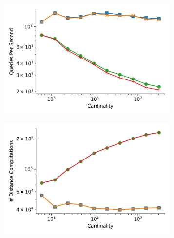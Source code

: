 \begin{figure}
\begin{subfigure}[b]{0.5\textwidth}
        \label{fig:results:glove-25-counts-counts}
    \end{subfigure}%
    \\
    \begin{subfigure}[b]{0.5\textwidth}
        \includegraphics[width=0.99\textwidth]{images/distance_counts/fashion-mnist_KnnBreadthFirst_10_throughput.png}
        \label{fig:results:sift-counts-throughput}
    \end{subfigure}%
    \begin{subfigure}[b]{0.5\textwidth}
        \includegraphics[width=0.99\textwidth]{images/distance_counts/fashion-mnist_KnnBreadthFirst_10_counts.png}
        \label{fig:results:random-counts-counts}
    \end{subfigure}%
    \\

\end{figure}
